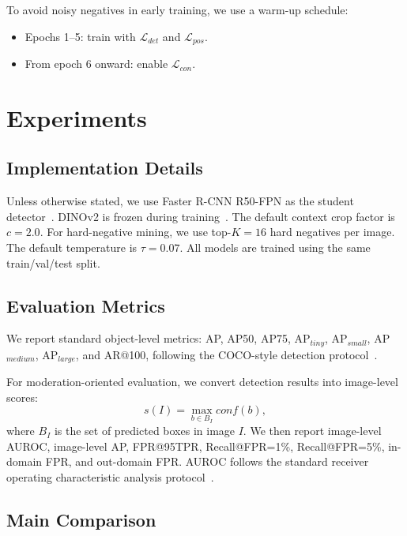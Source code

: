 \documentclass[conference,a4paper]{IEEEtran}
\begin{document}
To avoid noisy negatives in early training, we use a warm-up schedule:
\begin{itemize}
    \item Epochs 1--5: train with $\mathcal{L}_{det}$ and $\mathcal{L}_{pos}$.
    \item From epoch 6 onward: enable $\mathcal{L}_{con}$.
\end{itemize}

\section{Experiments}

\subsection{Implementation Details}

Unless otherwise stated, we use Faster R-CNN R50-FPN as the student detector~\cite{ren2015faster,lin2017feature}.
DINOv2 is frozen during training~\cite{oquab2024dinov2}.
The default context crop factor is $c=2.0$.
For hard-negative mining, we use top-$K=16$ hard negatives per image.
The default temperature is $\tau=0.07$.
All models are trained using the same train/val/test split.

\subsection{Evaluation Metrics}

We report standard object-level metrics:
AP, AP50, AP75, AP$_{tiny}$, AP$_{small}$, AP$_{medium}$, AP$_{large}$, and AR@100, following the COCO-style detection protocol~\cite{lin2014microsoft}.

For moderation-oriented evaluation, we convert detection results into image-level scores:
\begin{equation}
s(I) = \max_{b \in B_I} conf(b),
\end{equation}
where $B_I$ is the set of predicted boxes in image $I$.
We then report image-level AUROC, image-level AP, FPR@95TPR, Recall@FPR=1\%, Recall@FPR=5\%, in-domain FPR, and out-domain FPR.
AUROC follows the standard receiver operating characteristic analysis protocol~\cite{fawcett2006introduction}.

\subsection{Main Comparison}
\end{document}
